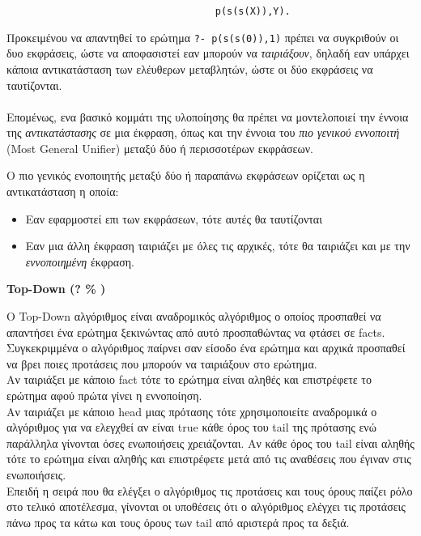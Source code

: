 \documentclass[10pt]{article}
\begin{document}
\begin{verbatim}
                                    p(s(s(X)),Y).
\end{verbatim}

Προκειμένου να απαντηθεί το ερώτημα \verb|?- p(s(s(0)),1)| πρέπει να συγκριθούν οι δυο εκφράσεις, ώστε να αποφασιστεί εαν μπορούν να \textit{ταιριάξουν}, δηλαδή εαν υπάρχει κάποια αντικατάσταση των ελέυθερων μεταβλητών, ώστε οι δύο εκφράσεις να ταυτίζονται. \\
\\
Επομένως, ενα βασικό κομμάτι της υλοποίησης θα πρέπει να μοντελοποιεί την έννοια της \textit{αντικατάστασης} σε μια έκφραση, όπως και την έννοια του \textit{πιο γενικού εννοποιτή} (Most General Unifier) μεταξύ δύο ή περισσοτέρων εκφράσεων.

Ο πιο γενικός ενοποιητής μεταξύ δύο ή παραπάνω εκφράσεων ορίζεται ως η αντικατάσταση η οποία:
\begin{itemize}
    \item Εαν εφαρμοστεί επι των εκφράσεων, τότε αυτές θα ταυτίζονται 
    \item Εαν μια άλλη έκφραση ταιριάζει με όλες τις αρχικές, τότε θα ταιριάζει και με την \textit{εννοποιημένη} έκφραση.
\end{itemize}


\textbf{Top-Down (? \% )}

Ο Top-Down αλγόριθμος είναι αναδρομικός αλγόριθμος ο οποίος προσπαθεί να απαντήσει ένα ερώτημα ξεκινώντας από αυτό προσπαθώντας να φτάσει σε facts.
\\
Συγκεκριμμένα ο αλγόριθμος παίρνει σαν είσοδο ένα ερώτημα και αρχικά προσπαθεί να βρει ποιες προτάσεις που μπορούν να ταιριάξουν στο ερώτημα.
\\
Αν ταιριάξει με κάποιο fact τότε το ερώτημα είναι αληθές και επιστρέφετε το ερώτημα αφού πρώτα γίνει η εννοποίηση.
\\
Αν ταιριάζει με κάποιο head μιας πρότασης τότε χρησιμοποιείτε αναδρομικά ο αλγόριθμος για να ελεγχθεί αν είναι true κάθε όρος του tail της πρότασης ενώ παράλληλα γίνονται όσες ενωποιήσεις χρειάζονται. Αν κάθε όρος του tail είναι αληθής τότε το ερώτημα είναι αληθής και επιστρέφετε μετά από τις αναθέσεις που έγιναν στις ενωποιήσεις.
\\ 
Επειδή η σειρά που θα ελέγξει ο αλγόριθμος τις προτάσεις και τους όρους παίζει ρόλο στο τελικό αποτέλεσμα, γίνονται οι υποθέσεις ότι ο αλγόριθμος ελέγχει τις προτάσεις πάνω προς τα κάτω και τους όρους των tail από αριστερά προς τα δεξιά.
\end{document}
